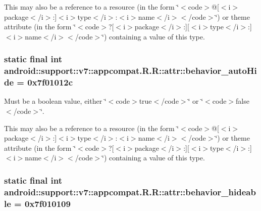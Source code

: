 This may also be a reference to a resource (in the form \char`\"{}$<$code$>$@\mbox{[}$<$i$>$package$<$/i$>$:\mbox{]}$<$i$>$type$<$/i$>$:$<$i$>$name$<$/i$>$$<$/code$>$\char`\"{}) or theme attribute (in the form \char`\"{}$<$code$>$?\mbox{[}$<$i$>$package$<$/i$>$:\mbox{]}\mbox{[}$<$i$>$type$<$/i$>$:\mbox{]}$<$i$>$name$<$/i$>$$<$/code$>$\char`\"{}) containing a value of this type. \hypertarget{classandroid_1_1support_1_1v7_1_1appcompat_1_1_r_1_1attr_7f5a467482726a6f44b8bf58a9e35d7d}{
\subsubsection[{behavior\_\-autoHide}]{\setlength{\rightskip}{0pt plus 5cm}static final int android::support::v7::appcompat.R.R::attr::behavior\_\-autoHide = 0x7f01012c}}
\label{classandroid_1_1support_1_1v7_1_1appcompat_1_1_r_1_1attr_7f5a467482726a6f44b8bf58a9e35d7d}


Must be a boolean value, either \char`\"{}$<$code$>$true$<$/code$>$\char`\"{} or \char`\"{}$<$code$>$false$<$/code$>$\char`\"{}. 

This may also be a reference to a resource (in the form \char`\"{}$<$code$>$@\mbox{[}$<$i$>$package$<$/i$>$:\mbox{]}$<$i$>$type$<$/i$>$:$<$i$>$name$<$/i$>$$<$/code$>$\char`\"{}) or theme attribute (in the form \char`\"{}$<$code$>$?\mbox{[}$<$i$>$package$<$/i$>$:\mbox{]}\mbox{[}$<$i$>$type$<$/i$>$:\mbox{]}$<$i$>$name$<$/i$>$$<$/code$>$\char`\"{}) containing a value of this type. \hypertarget{classandroid_1_1support_1_1v7_1_1appcompat_1_1_r_1_1attr_eb2ede66f1fc37018d5c2e18747d988a}{
\subsubsection[{behavior\_\-hideable}]{\setlength{\rightskip}{0pt plus 5cm}static final int android::support::v7::appcompat.R.R::attr::behavior\_\-hideable = 0x7f010109}}
\label{classandroid_1_1support_1_1v7_1_1appcompat_1_1_r_1_1attr_eb2ede66f1fc37018d5c2e18747d988a}


